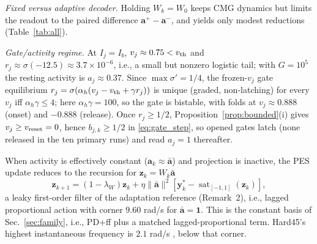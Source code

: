 \documentclass[letterpaper, 10 pt, conference]{ieeeconf}
\newcommand{\sat}{\operatorname{sat}}
\begin{document}
\emph{Fixed versus adaptive decoder.} Holding $W_k=W_0$ keeps CMG dynamics but limits the readout to the paired difference $\bm a^+-\bm a^-$, and yields only modest reductions (Table~\ref{tab:all}).

\emph{Gate/activity regime.} At $I_j=I_b$, $v_j\approx0.75<v_{\rm th}$ and $r_j\approx\sigma(-12.5)\approx3.7\times10^{-6}$, i.e., a small but nonzero logistic tail; with $G=10^5$ the resting activity is $a_j\approx0.37$. Since $\max\sigma'=1/4$, the frozen-$v_j$ gate equilibrium $r_j=\sigma(\alpha_h(v_j-v_{\rm th}+\gamma r_j))$ is unique (graded, non-latching) for every $v_j$ iff $\alpha_h\gamma\le4$; here $\alpha_h\gamma=100$, so the gate is bistable, with folds at $v_j\approx0.888$ (onset) and $-0.888$ (release). Once $r_j\ge1/2$, Proposition~\ref{prop:bounded}(i) gives $v_j\ge v_{\rm reset}=0$, hence $b_{j,k}\ge1/2$ in \eqref{eq:gate_step}, so opened gates latch (none released in the ten primary runs) and read $a_j=1$ thereafter.

When activity is effectively constant ($\bm a_k\approx\bar{\bm a}$) and projection is inactive, the PES update reduces to the recursion for $\bm z_k=W_k\bar{\bm a}$
\begin{equation}
 \bm z_{k+1}=(1-\lambda_W)\bm z_k
 +\eta\|\bar{\bm a}\|^2[\bm y_k^*-\sat_{[-1,1]}(\bm z_k)],
 \label{eq:constantbasis}
\end{equation}
a leaky first-order filter of the adaptation reference (Remark~2), i.e., lagged proportional action with corner $9.60$ rad/s for $\bar{\bm a}=\bm1$. This is the constant basis of Sec.~\ref{sec:family}, i.e., PD+ff plus a matched lagged-proportional term. Hard45's highest instantaneous frequency is $2.1$ rad/s \cite{sandoval2018instantaneous}, below that corner.
\end{document}
